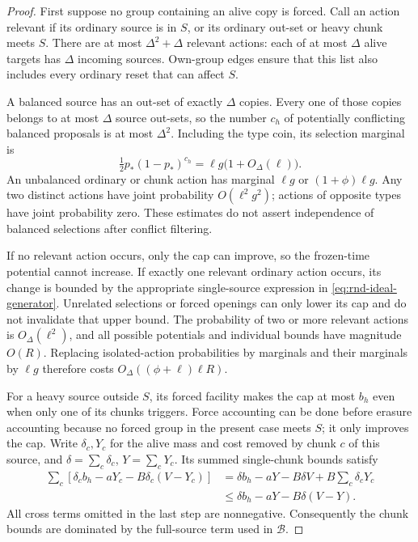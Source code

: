 \begin{proof}
First suppose no group containing an alive copy is forced.  Call an
action relevant if its ordinary source is in $S$, or its ordinary
out-set or heavy chunk meets $S$.  There are at most
$\Delta^2+\Delta$ relevant actions: each of at most $\Delta$ alive
targets has $\Delta$ incoming sources.  Own-group edges ensure that
this list also includes every ordinary reset that can affect $S$.

A balanced source has an out-set of exactly $\Delta$ copies.  Every
one of those copies belongs to at most $\Delta$ source out-sets, so
the number $c_h$ of potentially conflicting balanced proposals is at
most $\Delta^2$.  Including the type coin, its selection marginal is
\[
 \tfrac12p_*(1-p_*)^{c_h}
 =\ell g\bigl(1+O_\Delta(\ell)\bigr).
\]
An unbalanced ordinary or chunk action has marginal $\ell g$ or
$(1+\phi)\ell g$.  Any two distinct actions have joint probability
$O(\ell^2g^2)$; actions of opposite types have joint probability zero.
These estimates do not assert independence of balanced selections
after conflict filtering.

If no relevant action occurs, only the cap can improve, so the
frozen-time potential cannot increase.  If exactly one relevant
ordinary action occurs, its change is bounded by the appropriate
single-source expression in \eqref{eq:rnd-ideal-generator}.
Unrelated selections or forced openings can only lower its cap and
do not invalidate that upper bound.  The probability of two or more
relevant actions is $O_\Delta(\ell^2)$, and all possible potentials
and individual bounds have magnitude $O(R)$.  Replacing isolated-action
probabilities by marginals and their marginals by $\ell g$ therefore
costs $O_\Delta((\phi+\ell)\ell R)$.

For a heavy source outside $S$, its forced facility makes the cap at
most $b_h$ even when only one of its chunks triggers.  Force accounting
can be done before erasure accounting because no forced group in the
present case meets $S$; it only improves the cap.  Write
$\delta_c,Y_c$ for the alive mass and cost removed by chunk $c$ of
this source, and $\delta=\sum_c\delta_c$, $Y=\sum_cY_c$.  Its summed
single-chunk bounds satisfy
\begin{align*}
 \sum_c[\delta_cb_h-aY_c-B\delta_c(V-Y_c)]
 &=\delta b_h-aY-B\delta V+B\sum_c\delta_cY_c\\
 &\le\delta b_h-aY-B\delta(V-Y).
\end{align*}
All cross terms omitted in the last step are nonnegative.  Consequently
the chunk bounds are dominated by the full-source term used in
$\mathcal B$.


\end{proof}
